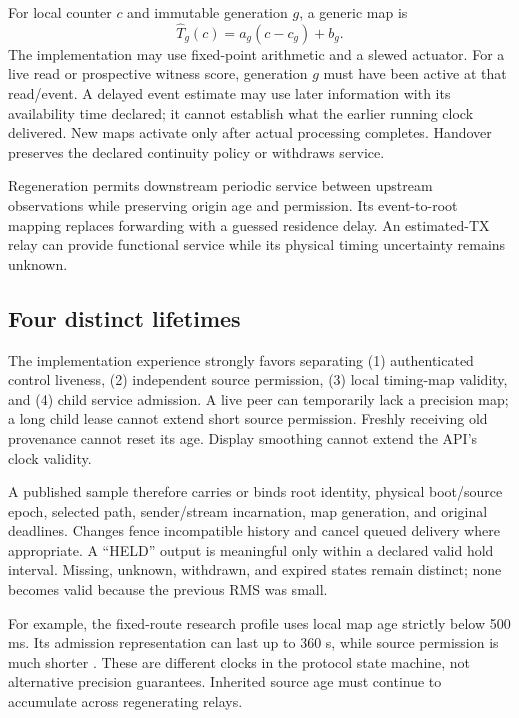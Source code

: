 \documentclass[11pt,letterpaper]{article}
\begin{document}
For local counter $c$ and immutable generation $g$, a generic map is
\begin{equation}
\widehat T_g(c)=a_g(c-c_g)+b_g.
\end{equation}
The implementation may use fixed-point arithmetic and a slewed actuator. For a live read or prospective witness score, generation $g$ must have been active at that read/event. A delayed event estimate may use later information with its availability time declared; it cannot establish what the earlier running clock delivered. New maps activate only after actual processing completes. Handover preserves the declared continuity policy or withdraws service.

Regeneration permits downstream periodic service between upstream observations while preserving origin age and permission. Its event-to-root mapping replaces forwarding with a guessed residence delay. An estimated-TX relay can provide functional service while its physical timing uncertainty remains unknown.

\subsection{Four distinct lifetimes}
The implementation experience strongly favors separating (1) authenticated control liveness, (2) independent source permission, (3) local timing-map validity, and (4) child service admission. A live peer can temporarily lack a precision map; a long child lease cannot extend short source permission. Freshly receiving old provenance cannot reset its age. Display smoothing cannot extend the API's clock validity.

A published sample therefore carries or binds root identity, physical boot/source epoch, selected path, sender/stream incarnation, map generation, and original deadlines. Changes fence incompatible history and cancel queued delivery where appropriate. A ``HELD'' output is meaningful only within a declared valid hold interval. Missing, unknown, withdrawn, and expired states remain distinct; none becomes valid because the previous RMS was small.

For example, the fixed-route research profile uses local map age strictly below 500 ms. Its admission representation can last up to 360 s, while source permission is much shorter \cite{v14}. These are different clocks in the protocol state machine, not alternative precision guarantees. Inherited source age must continue to accumulate across regenerating relays.
\end{document}
